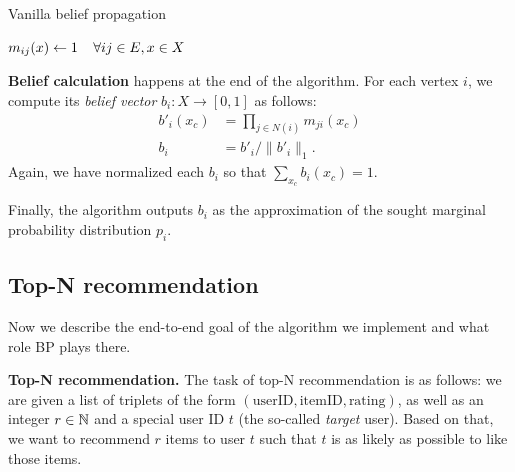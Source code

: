 \documentclass[letterpaper]{article}
\newcommand{\mypar}[1]{{\bf #1.}}
\newcommand{\myparcont}[1]{{\bf #1}}
\begin{document}
\begin{algorithm}
\caption{Vanilla belief propagation}
\label{algo:propagate}
\algodefaults
	$m_{ij}(x) \leftarrow 1\mkern 20mu\forall ij \in E, x \in X$\;
	
\end{algorithm}

\myparcont{Belief calculation} happens at the end of the algorithm. For each
vertex $i$, we compute its \emph{belief vector} $b_i: X \to [0, 1]$ as follows:
%
\begin{align*}
	b'_i(x_c) &= \prod_{j \in N(i)} m_{ji}(x_c) \\
	b_i &= b'_{i} / \|b'_i\|_1.
\end{align*}
%
Again, we have normalized each $b_i$ so that $\sum_{x_c} b_i(x_c) = 1$.

Finally, the algorithm outputs $b_i$ as the approximation of the sought
marginal probability distribution $p_i$.

\subsection{Top-N recommendation} \label{subsec:topn}

Now we describe the end-to-end goal of the algorithm we implement and what role
BP plays there.

\mypar{Top-N recommendation} The task of top-N recommendation is as follows: we
are given a list of triplets of the form $(\text{userID}, \text{itemID},
\text{rating})$, as well as an integer $r\in\mathbb{N}$ and a special user ID $t$ (the
so-called \emph{target} user). Based on that, we want to recommend $r$ items to
user $t$ such that $t$ is as likely as possible to like those items.
\end{document}
